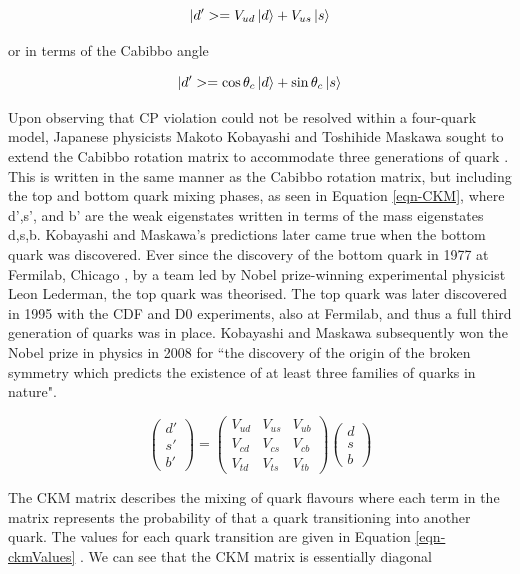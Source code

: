 \begin{equation}
|d'> = V_{ud}\ket{d} + V_{us}\ket{s}
\end{equation}

or in terms of the Cabibbo angle 

\begin{equation}
|d'> = \cos\theta_c\ket{d} + \sin\theta_c\ket{s}
\end{equation}

Upon observing that CP violation could not be resolved within a four-quark model, Japanese physicists Makoto Kobayashi and Toshihide Maskawa 
sought to extend the Cabibbo rotation matrix to accommodate three generations of quark \cite{Kobayashi:1973fv}. This is written in the same 
manner as the Cabibbo rotation matrix, but including the top and bottom quark mixing phases, as seen in Equation \ref{eqn-CKM}, where d',s', 
and b' are the weak eigenstates written in terms of the mass eigenstates d,s,b. Kobayashi and Maskawa's predictions later came true when the 
bottom quark was discovered. Ever since the discovery of the bottom quark in 1977 at Fermilab, Chicago \cite{Innes:1977ae}, by a team led by 
Nobel prize-winning experimental physicist Leon Lederman, the top quark was theorised. The top quark was later discovered in 1995 with the CDF
\cite{PhysRevLett.74.2626} and D0 \cite{PhysRevLett.74.2422} experiments, also at Fermilab, and thus a full third generation of quarks was in 
place. Kobayashi and Maskawa subsequently won the Nobel prize in physics in 2008 for ``the discovery of the origin of the broken symmetry which 
predicts the existence of at least three families of quarks in nature".

\begin{equation}
\begin{pmatrix}
d' \\
s' \\
b' 
\end{pmatrix}
=
\begin{pmatrix}
V_{ud} & V_{us} & V_{ub} \\
V_{cd} & V_{cs} & V_{cb} \\
V_{td} & V_{ts} & V_{tb} 
\end{pmatrix}
\begin{pmatrix}
d \\
s \\
b 
\end{pmatrix}
\label{eqn-CKM}
\end{equation} 

The CKM matrix describes the mixing of quark flavours where each term in the matrix represents the probability of that a quark transitioning 
into another quark. The values for each quark transition are given in Equation \ref{eqn-ckmValues} \cite{ckmValues}. We can see that the CKM matrix is essentially 
diagonal %


